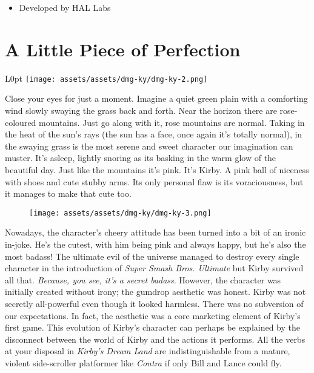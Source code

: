 \documentclass{book}
\begin{document}
\begin{itemize} [nosep]
\item Developed by HAL Labs

\end{itemize}\noindent

\newpage\FloatBarrier\needspace{10mm}\section*{A Little Piece of Perfection}\nopagebreak[4]
\begin{wrapfigure}{L}{0pt} \texttt{[image: assets/assets/dmg-ky/dmg-ky-2.png]}\end{wrapfigure}
Close your eyes for just a moment. Imagine a quiet green plain with a comforting wind slowly swaying the grass back and forth. Near the horizon there are rose-coloured mountains. Just go along with it, rose mountains are normal. Taking in the heat of the sun’s rays (the sun has a face, once again it’s totally normal), in the swaying grass is the most serene and sweet character our imagination can muster. It’s asleep, lightly snoring as its basking in the warm glow of the beautiful day. Just like the mountains it’s pink. It’s Kirby. A pink ball of niceness with shoes and cute stubby arms. Its only personal flaw is its voraciousness, but it manages to make that cute too.

\begin{figure}[hbt]
\vskip 10pt
\centering \texttt{[image: assets/assets/dmg-ky/dmg-ky-3.png]}
\vskip 6pt
\end{figure}

Nowadays, the character’s cheery attitude has been turned into a bit of an ironic in-joke. He’s the cutest, with him being pink and always happy, but he’s also the most badass! The ultimate evil of the universe managed to destroy every single character in the introduction of \emph{Super Smash Bros. Ultimate} but Kirby survived all that. \emph{Because, you see, it’s a secret badass}. However, the character was initially created without irony; the gumdrop aesthetic was honest. Kirby was not secretly all-powerful even though it looked harmless. There was no subversion of our expectations. In fact, the aesthetic was a core marketing element of Kirby’s first game. This evolution of Kirby’s character can perhaps be explained by the disconnect between the world of Kirby and the actions it performs. All the verbs at your disposal in \emph{Kirby’s Dream Land} are indistinguishable from a mature, violent side-scroller platformer like \emph{Contra} if only Bill and Lance could fly.
\end{document}
